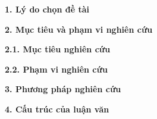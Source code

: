 \lmd
\textbf{1. Lý do chọn đề tài}



\textbf{2. Mục tiêu và phạm vi nghiên cứu}

\textbf{2.1. Mục tiêu nghiên cứu}

\textbf{2.2. Phạm vi nghiên cứu}

\textbf{3. Phương pháp nghiên cứu}



\textbf{4. Cấu trúc của luận văn}



\hspace{.5cm}
